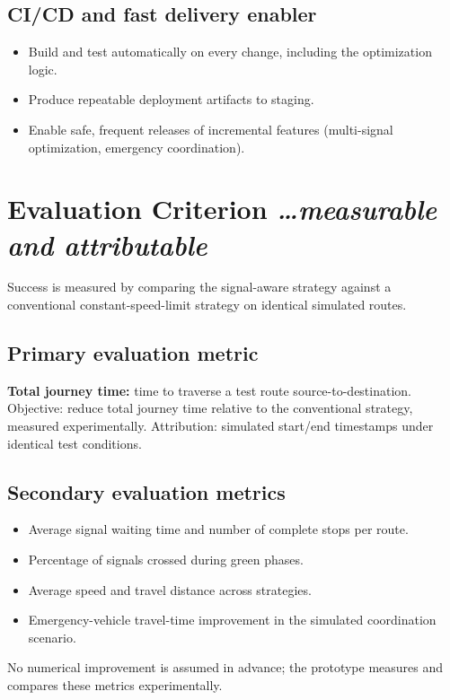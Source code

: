 \documentclass[11pt,a4paper]{article}
\newcommand{\BvrHint}[1]{%
  {\normalfont\normalsize\itshape\hfill #1}}
\begin{document}
\subsection{CI/CD and fast delivery enabler}
\begin{itemize}[leftmargin=0.7cm]
    \item Build and test automatically on every change, including the optimization logic.
    \item Produce repeatable deployment artifacts to staging.
    \item Enable safe, frequent releases of incremental features (multi-signal optimization, emergency coordination).
\end{itemize}

\section{Evaluation Criterion %
\BvrHint{\ldots measurable and attributable}}
Success is measured by comparing the signal-aware strategy against a conventional constant-speed-limit strategy on identical simulated routes.

\subsection{Primary evaluation metric}
\textbf{Total journey time:} time to traverse a test route source-to-destination. Objective: reduce total journey time relative to the conventional strategy, measured experimentally. Attribution: simulated start/end timestamps under identical test conditions.

\subsection{Secondary evaluation metrics}
\begin{itemize}[leftmargin=0.7cm]
    \item Average signal waiting time and number of complete stops per route.
    \item Percentage of signals crossed during green phases.
    \item Average speed and travel distance across strategies.
    \item Emergency-vehicle travel-time improvement in the simulated coordination scenario.
\end{itemize}
No numerical improvement is assumed in advance; the prototype measures and compares these metrics experimentally.
\end{document}
